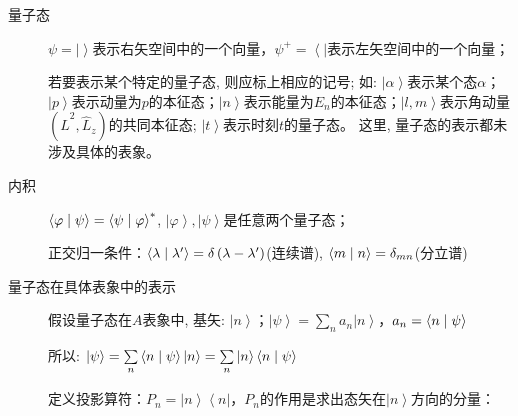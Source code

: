 \begin{description}
\item[量子态] $\psi = \left| {} \right\rangle $表示右矢空间中的一个向量，$\psi ^ +   =
\left\langle {} \right|$表示左矢空间中的一个向量；



若要表示某个特定的量子态, 则应标上相应的记号; 如: $\left| \alpha
\right\rangle $表示某个态$\alpha$；$\left| p \right\rangle
$表示动量为$p$的本征态；$\left| n \right\rangle
$表示能量为$E_n$的本征态；$\left| {l,m} \right\rangle
$表示角动量$\left( {\widehat L^2 ,\widehat L_z }
\right)$的共同本征态; $\left| t \right\rangle $表示时刻$t$的量子态。
这里, 量子态的表示都未涉及具体的表象。


\item[内积] $\left\langle {\varphi }
 \mathrel{\left | {\vphantom {\varphi  \psi }}
 \right. \kern-\nulldelimiterspace}
 {\psi } \right\rangle  = \left\langle {\psi }
 \mathrel{\left | {\vphantom {\psi  \varphi }}
 \right. \kern-\nulldelimiterspace}
 {\varphi } \right\rangle ^* $, $\left| \varphi  \right\rangle ,\left| \psi  \right\rangle $是任意两个量子态；


正交归一条件：$\left\langle {\lambda }
 \mathrel{\left | {\vphantom {\lambda  {\lambda '}}}
 \right. \kern-\nulldelimiterspace}
 {{\lambda '}} \right\rangle  = \delta \left( {\lambda  - \lambda '} \right)$(连续谱), $\left\langle {m}
 \mathrel{\left | {\vphantom {m n}}
 \right. \kern-\nulldelimiterspace}
 {n} \right\rangle  = \delta _{mn} $(分立谱)


\item[量子态在具体表象中的表示] 

假设量子态在$A$表象中, 基矢: $\left| n
\right\rangle $；$\left| \psi  \right\rangle  = \sum\limits_n {a_n \left| n \right\rangle } $，$a_n  = \left\langle {n}
 \mathrel{\left | {\vphantom {n \psi }}
 \right. \kern-\nulldelimiterspace}
 {\psi } \right\rangle $


所以: $\left| \psi  \right\rangle  = \sum\limits_n {\left\langle {n}
 \mathrel{\left | {\vphantom {n \psi }}
 \right. \kern-\nulldelimiterspace}
 {\psi } \right\rangle \left| n \right\rangle }  = \sum\limits_n {\left| n \right\rangle \left\langle {n}
 \mathrel{\left | {\vphantom {n \psi }}
 \right. \kern-\nulldelimiterspace}
 {\psi } \right\rangle } $

定义投影算符：$P_n  = \left| n \right\rangle \left\langle n \right|$，$P_n$的作用是求出态矢在$\left| n \right\rangle $方向的分量：


\end{description}
